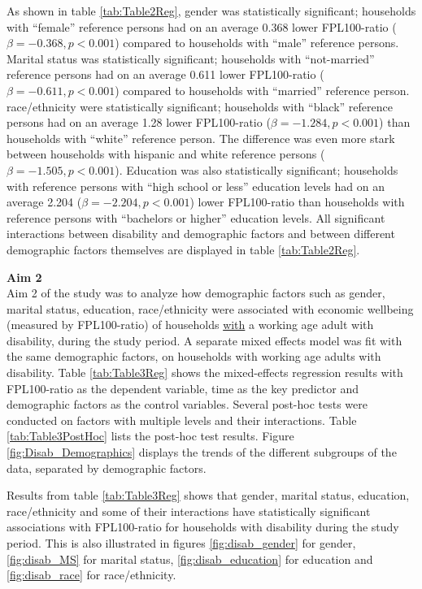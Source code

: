 \documentclass[11pt]{extarticle} %
\begin{document}
As shown in table \ref{tab:Table2Reg}, gender was statistically significant; households with ``female'' reference persons had on an average 0.368 lower FPL100-ratio ($\beta = -0.368, p < 0.001$) compared to households with ``male'' reference persons. Marital status was statistically significant; households with ``not-married'' reference persons had on an average 0.611 lower FPL100-ratio ($\beta = -0.611, p < 0.001$) compared to households with ``married'' reference person. race/ethnicity were statistically significant; households with ``black'' reference persons had on an average 1.28 lower FPL100-ratio ($\beta = -1.284, p < 0.001$) than households with ``white'' reference person. The difference was even more stark between households with hispanic and white reference persons ($\beta = -1.505, p < 0.001$). Education was also statistically significant; households with reference persons with ``high school or less'' education levels had on an average 2.204 ($\beta = -2.204, p < 0.001$) lower FPL100-ratio than households with reference persons with ``bachelors or higher'' education levels. All significant interactions between disability and demographic factors and between different demographic factors themselves are displayed in table \ref{tab:Table2Reg}.

\noindent
{\bf{Aim 2}}\\
Aim 2 of the study was to analyze how demographic factors such as gender, marital status, education, race/ethnicity were associated with economic wellbeing (measured by FPL100-ratio) of households {\underline{with}} a working age adult with disability, during the study period. A separate mixed effects model was fit with the same demographic factors, on households with working age adults with disability. Table \ref{tab:Table3Reg} shows the mixed-effects regression results with FPL100-ratio as the dependent variable, time as the key predictor and demographic factors as the control variables. Several post-hoc tests were conducted on factors with multiple levels and their interactions. Table \ref{tab:Table3PostHoc} lists the post-hoc test results. Figure \ref{fig:Disab_Demographics} displays the trends of the different subgroups of the data, separated by demographic factors. 

Results from table \ref{tab:Table3Reg} shows that gender, marital status, education, race/ethnicity and some of their interactions have statistically significant associations with FPL100-ratio for households with disability during the study period. This is also illustrated in figures \ref{fig:disab_gender} for gender, \ref{fig:disab_MS} for marital status, \ref{fig:disab_education} for education and \ref{fig:disab_race} for race/ethnicity. 
\end{document}
